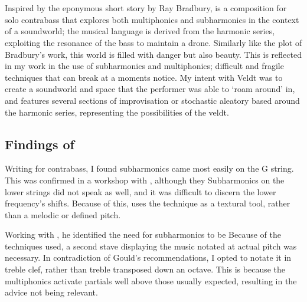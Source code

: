 \section{\bassPiece} \label{sec:bassPiece}
Inspired by the eponymous short story by Ray Bradbury, \bassPiece \space is a composition for solo contrabass that explores both multiphonics and subharmonics in the context of a soundworld; the musical language is derived from the harmonic series, exploiting the resonance of the bass to maintain a drone.
Similarly like the plot of Bradbury's work, this world is filled with danger but also beauty. 
This is reflected in my work in the use of subharmonics and multiphonics; difficult and fragile techniques that can break at a moments notice.
My intent with Veldt was to create a soundworld and space that the performer was able to `roam around' in, and features several sections of improvisation or stochastic aleatory based around the harmonic series, representing the possibilities of the veldt.

\subsection{Findings of \bassPiece}
Writing for contrabass, I found subharmonics came most easily on the G string. 
This was confirmed in a workshop with \bassParticipant, although they 
Subharmonics on the lower strings did not speak as well, and it was difficult to discern the lower frequency's shifts.
Because of this, \bassPiece \space uses the technique as a textural tool, rather than a melodic or defined pitch.

Working with \bassParticipant, he identified the need for subharmonics to be 
Because of the techniques used, a second stave displaying the music notated at actual pitch was necessary.
In contradiction of Gould's recommendations, I opted to notate it in treble clef, rather than treble transposed down an octave.\autocite[423]{gouldBars2011}
This is because the multiphonics activate partials well above those usually expected, resulting in the advice not being relevant.



